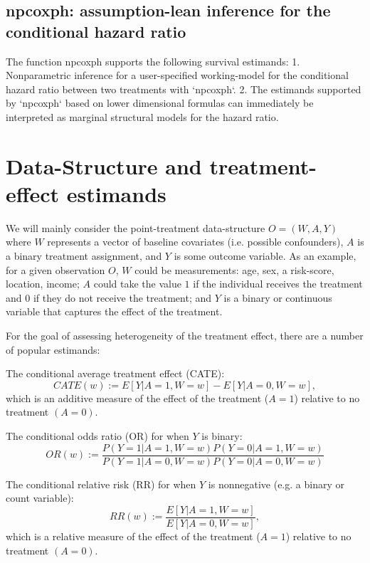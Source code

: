 \documentclass{article}
\begin{document}
\subsection{npcoxph: assumption-lean inference for the conditional hazard ratio}
The function npcoxph supports the following survival estimands:
1. Nonparametric inference for a user-specified working-model for the conditional hazard ratio between two treatments with `npcoxph`.
2. The estimands supported by `npcoxph` based on lower dimensional formulas can immediately be interpreted as marginal structural models for the hazard ratio.






\section{Data-Structure and treatment-effect estimands}
We will mainly consider the point-treatment data-structure $O = (W,A,Y)$ where $W$ represents a vector of baseline covariates (i.e. possible confounders), $A$ is a binary treatment assignment, and $Y$ is some outcome variable. As an example, for a given observation $O$, $W$ could be measurements: age, sex, a risk-score, location, income; $A$ could take the value $1$ if the individual receives the treatment and $0$ if they do not receive the treatment; and $Y$ is a binary or continuous variable that captures the effect of the treatment.

For the goal of assessing heterogeneity of the treatment effect, there are a number of popular estimands:

\noindent The conditional average treatment effect (CATE):
\begin{equation}
CATE(w) := E[Y|A=1,W=w] - E[Y|A=0, W=w],
\end{equation}
which is an additive measure of the effect of the treatment ($A=1$) relative to no treatment $(A=0)$.

\noindent The conditional odds ratio (OR) for when $Y$ is binary:
\begin{equation}
OR(w) := \frac{P(Y=1|A=1,W=w)P(Y=0|A=1,W=w)}{P(Y=1|A=0,W=w)P(Y=0|A=0,W=w)}
\end{equation}

\noindent The conditional relative risk (RR) for when $Y$ is nonnegative (e.g. a binary or count variable):
\begin{equation}
RR(w) := \frac{E[Y|A=1,W=w]}{E[Y|A=0,W=w]},
\end{equation}
which is a relative measure of the effect of the treatment ($A=1$) relative to no treatment $(A=0)$.
\end{document}
